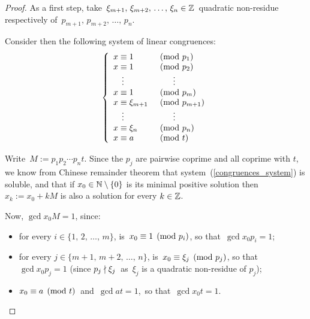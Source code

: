 \begin{proof}
%
As a first step, take
\,$\xi_{m+1},\, \xi_{m+2},\, \ldots,\, \xi_n \in \mathbb{Z}$\,
quadratic non-residue respectively of
\,$p_{m+1},\, p_{m+2},\, \ldots,\, p_n$.

Consider then the following system of linear congruences:
\medskip
\begin{equation}\label{congruences_system}
%
\left\{
\begin{array}{ll}
x \congruent 1 & \pmod{p_1} \\
x \congruent 1 & \pmod{p_2} \\
\quad \vdots & \quad\quad \vdots \\
x \congruent 1 & \pmod{p_m} \\
x \congruent \xi_{m+1} & \pmod{p_{m+1}}\\
\quad \vdots & \quad\quad \vdots \\
x \congruent \xi_n & \pmod{p_n} \\
x \congruent a & \pmod{t} \\
\end{array}
\right.
\end{equation}
%

\bigskip
Write\, $M:= p_1 p_2 \cdots p_n t$.
Since the $p_j$ are pairwise coprime and all coprime with $t$,
we know from Chinese remainder theorem that \mbox{system
(\ref{congruences_system})} is soluble, and that if
$x_0 \in \mathbb{N}\setminus\left\{0\right\}$ is its minimal positive solution then
$x_k := x_0 + kM$ is also a solution for every $k \in \mathbb{Z}$.

Now, $\gcd{x_0}{M} = 1$, since:
%
\begin{itemize}

\item
for every $i \in  \{ 1,\, 2,\, \ldots, \, m \}$, is\,
$x_0 \equiv 1 \pmod{p_i}$, so that\, $\gcd{x_0}{p_i} = 1$;

\item
for every $j \in \{m+1,\, m+2,\,\ldots,\,n\}$, is\,
$x_0 \equiv \xi_j \pmod{p_j}$, so that\, $\gcd{x_0}{p_j} = 1$
(since $p_j \nmid \xi_j$ \,as\, $\xi_j$ is a
quadratic non-residue of $p_j$);

\item
$x_0 \equiv a \pmod t$\, and\, $\gcd{a}{t} = 1$,\,
so that\, $\gcd{x_0}{t} = 1$.

\end{itemize}


\end{proof}
